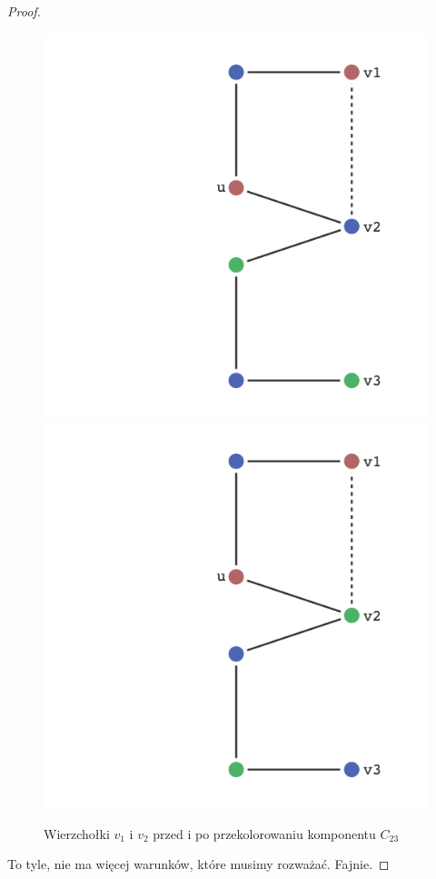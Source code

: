 \begin{proof}
\begin{enumerate}
                 \begin{figure}[H]
                    \centering
                    \includegraphics[scale=0.4]{chapters/dyskretna/colours/brooks/images/disconnected_before_swap.png}
                    \includegraphics[scale=0.4]{chapters/dyskretna/colours/brooks/images/disconnected_after_swap.png}
                    \caption{Wierzchołki $v_1$ i $v_2$ przed i po przekolorowaniu komponentu $C_{23}$}
                \end{figure}
                
                
        \end{enumerate}
        
        To tyle, nie ma więcej warunków, które musimy rozważać. Fajnie.
        
    \end{proof}